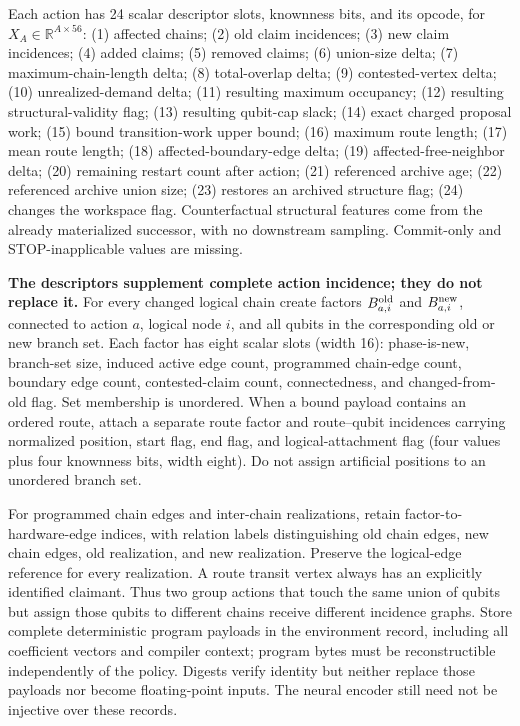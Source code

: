 \documentclass[11pt,a4paper]{article}
\theoremstyle{definition}\newtheorem{definition}[proposition]{Definition}
\begin{document}
Each action has 24 scalar descriptor slots, knownness bits, and its opcode, for \(X_A\in\mathbb R^{A\times56}\): (1) affected chains; (2) old claim incidences; (3) new claim incidences; (4) added claims; (5) removed claims; (6) union-size delta; (7) maximum-chain-length delta; (8) total-overlap delta; (9) contested-vertex delta; (10) unrealized-demand delta; (11) resulting maximum occupancy; (12) resulting structural-validity flag; (13) resulting qubit-cap slack; (14) exact charged proposal work; (15) bound transition-work upper bound; (16) maximum route length; (17) mean route length; (18) affected-boundary-edge delta; (19) affected-free-neighbor delta; (20) remaining restart count after action; (21) referenced archive age; (22) referenced archive union size; (23) restores an archived structure flag; (24) changes the workspace flag. Counterfactual structural features come from the already materialized successor, with no downstream sampling. Commit-only and STOP-inapplicable values are missing.

\textbf{The descriptors supplement complete action incidence; they do not replace it.} For every changed logical chain create factors \(B_{a,i}^{\rm old}\) and \(B_{a,i}^{\rm new}\), connected to action \(a\), logical node \(i\), and all qubits in the corresponding old or new branch set. Each factor has eight scalar slots (width 16): phase-is-new, branch-set size, induced active edge count, programmed chain-edge count, boundary edge count, contested-claim count, connectedness, and changed-from-old flag. Set membership is unordered. When a bound payload contains an ordered route, attach a separate route factor and route--qubit incidences carrying normalized position, start flag, end flag, and logical-attachment flag (four values plus four knownness bits, width eight). Do not assign artificial positions to an unordered branch set.

For programmed chain edges and inter-chain realizations, retain factor-to-hardware-edge indices, with relation labels distinguishing old chain edges, new chain edges, old realization, and new realization. Preserve the logical-edge reference for every realization. A route transit vertex always has an explicitly identified claimant. Thus two group actions that touch the same union of qubits but assign those qubits to different chains receive different incidence graphs. Store complete deterministic program payloads in the environment record, including all coefficient vectors and compiler context; program bytes must be reconstructible independently of the policy. Digests verify identity but neither replace those payloads nor become floating-point inputs. The neural encoder still need not be injective over these records.
\end{document}
